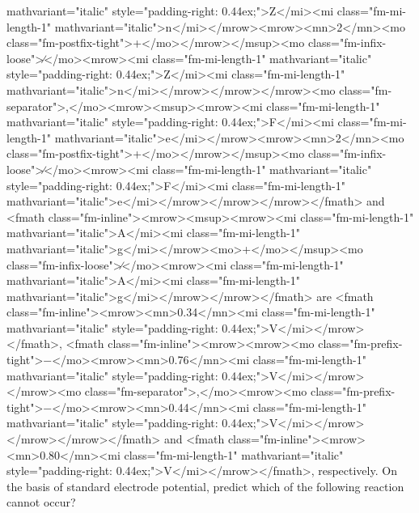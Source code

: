 \documentclass{article}
\begin{document}
mathvariant="italic" style="padding-right: 0.44ex;">Z</mi><mi class="fm-mi-length-1" mathvariant="italic">n</mi></mrow><mrow><mn>2</mn><mo class="fm-postfix-tight">+</mo></mrow></msup><mo class="fm-infix-loose">∕</mo><mrow><mi class="fm-mi-length-1" mathvariant="italic" style="padding-right: 0.44ex;">Z</mi><mi class="fm-mi-length-1" mathvariant="italic">n</mi></mrow></mrow></mrow><mo class="fm-separator">,</mo><mrow><msup><mrow><mi class="fm-mi-length-1" mathvariant="italic" style="padding-right: 0.44ex;">F</mi><mi class="fm-mi-length-1" mathvariant="italic">e</mi></mrow><mrow><mn>2</mn><mo class="fm-postfix-tight">+</mo></mrow></msup><mo class="fm-infix-loose">∕</mo><mrow><mi class="fm-mi-length-1" mathvariant="italic" style="padding-right: 0.44ex;">F</mi><mi class="fm-mi-length-1" mathvariant="italic">e</mi></mrow></mrow></mrow></fmath> and <fmath class="fm-inline"><mrow><msup><mrow><mi class="fm-mi-length-1" mathvariant="italic">A</mi><mi class="fm-mi-length-1" mathvariant="italic">g</mi></mrow><mo>+</mo></msup><mo class="fm-infix-loose">∕</mo><mrow><mi class="fm-mi-length-1" mathvariant="italic">A</mi><mi class="fm-mi-length-1" mathvariant="italic">g</mi></mrow></mrow></fmath> are <fmath class="fm-inline"><mrow><mn>0.34</mn><mi class="fm-mi-length-1" mathvariant="italic" style="padding-right: 0.44ex;">V</mi></mrow></fmath>, <fmath class="fm-inline"><mrow><mrow><mo class="fm-prefix-tight">−</mo><mrow><mn>0.76</mn><mi class="fm-mi-length-1" mathvariant="italic" style="padding-right: 0.44ex;">V</mi></mrow></mrow><mo class="fm-separator">,</mo><mrow><mo class="fm-prefix-tight">−</mo><mrow><mn>0.44</mn><mi class="fm-mi-length-1" mathvariant="italic" style="padding-right: 0.44ex;">V</mi></mrow></mrow></mrow></fmath> and <fmath class="fm-inline"><mrow><mn>0.80</mn><mi class="fm-mi-length-1" mathvariant="italic" style="padding-right: 0.44ex;">V</mi></mrow></fmath>, respectively. \newline On the basis of standard electrode potential, predict which of the following reaction cannot occur? 
\end{document}
